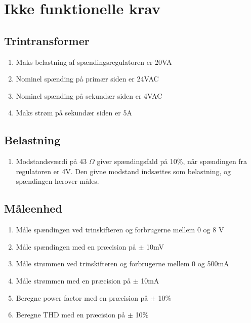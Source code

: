 
\section{Ikke funktionelle krav}

\subsection{Trintransformer}
\begin{enumerate}
	\item Maks belastning af spændingsregulatoren er 20VA
	\item Nominel spænding på primær siden er 24VAC
	\item Nominel spænding på sekundær siden er 4VAC
	\item Maks strøm på sekundær siden er 5A	
\end{enumerate}

\subsection{Belastning}
\begin{enumerate}
	\item Modstandsværdi på 43 $\Omega$ giver spændingsfald på 10\%, når spændingen fra regulatoren er 4V. Den givne modstand indsættes som belastning, og spændingen herover måles.
\end{enumerate}

\subsection{Måleenhed}
\label{subsec:ME}
\begin{enumerate}
	\item Måle spændingen ved trinskifteren og forbrugerne mellem 0 og 8 V
	\item Måle spændingen med en præcision på $\pm$ 10mV
	\item Måle strømmen ved trinskifteren og forbrugerne mellem 0 og 500mA
	\item Måle strømmen med en præcision på $\pm$ 10mA 
	\item Beregne power factor med en præcision på $\pm$ 10$\%$
	\item Beregne THD med en præcision på $\pm$ 10$\%$
\end{enumerate}


